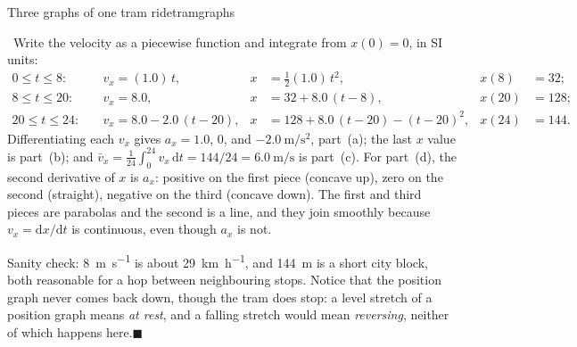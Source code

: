 \documentclass[11pt,twoside,openany]{book}
\newcommand{\dd}{\mathrm{d}}
\newcounter{check}[chapter]
\newcommand{\viewtag}[3]{\fcolorbox{#2}{#3}{\footnotesize\textbf{\textcolor{#2}{#1}}}}
\newcommand{\calctag}{\viewtag{Calculus}{calccol}{calcpale}}
\newcommand{\calc}{\par\medskip\noindent\calctag\ }
\newcommand{\qed}{\hfill$\blacksquare$}
\begin{document}
\begin{example}{Three graphs of one tram ride}{tramgraphs}
\calc Write the velocity as a piecewise function and integrate from $x(0) = 0$, in SI units:
\begin{align*}
0 \le t \le 8:&\quad v_x = (1.0)\,t, & x &= \tfrac12(1.0)\,t^2, & x(8) &= 32; \\
8 \le t \le 20:&\quad v_x = 8.0, & x &= 32 + 8.0\,(t - 8), & x(20) &= 128; \\
20 \le t \le 24:&\quad v_x = 8.0 - 2.0\,(t - 20), & x &= 128 + 8.0\,(t - 20) - (t - 20)^2, & x(24) &= 144.
\end{align*}
Differentiating each $v_x$ gives $a_x = 1.0$, $0$, and $-2.0\ \si{\metre\per\second\squared}$, part~(a); the last $x$ value is part~(b); and $\bar v_x = \frac{1}{24}\int_0^{24} v_x\,\dd t = 144/24 = \SI{6.0}{\metre\per\second}$ is part~(c). For part~(d), the second derivative of $x$ is $a_x$: positive on the first piece (concave up), zero on the second (straight), negative on the third (concave down). The first and third pieces are parabolas and the second is a line, and they join smoothly because $v_x = \dd x/\dd t$ is continuous, even though $a_x$ is not.

Sanity check: \SI{8}{\metre\per\second} is about \SI{29}{\kilo\metre\per\hour}, and \SI{144}{\metre} is a short city block, both reasonable for a hop between neighbouring stops. Notice that the position graph never comes back down, though the tram does stop: a level stretch of a position graph means \emph{at rest}, and a falling stretch would mean \emph{reversing}, neither of which happens here.\qed
\end{example}
\end{document}
